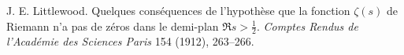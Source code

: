  J. E. Littlewood. Quelques cons\'equences de l'hypoth\`ese que la fonction $\zeta(s)$ de Riemann n'a pas de z\'eros dans le demi-plan $\Re s>\frac12$. \emph{Comptes Rendus de l'Acad\'emie des Sciences Paris} 154 (1912), 263--266.
